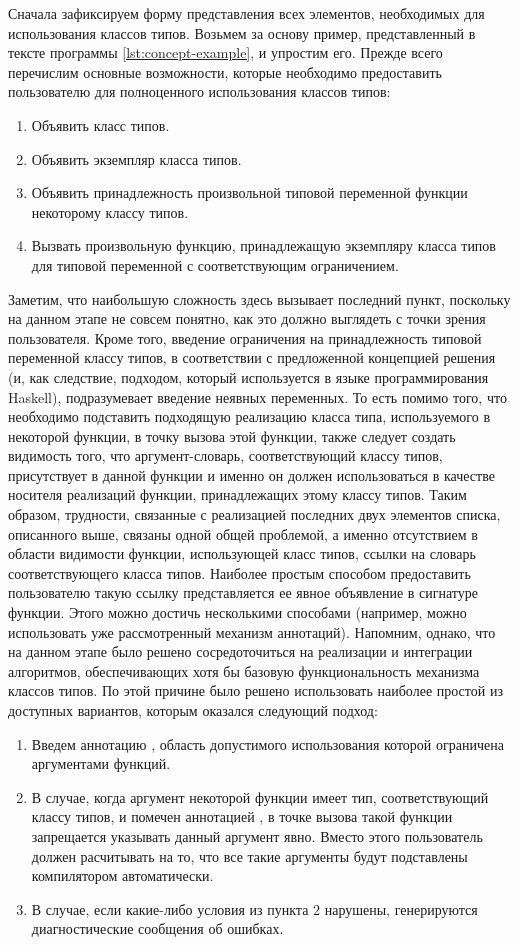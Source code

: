 Сначала зафиксируем форму представления всех элементов, необходимых для использования классов типов. Возьмем за основу пример, представленный в тексте программы \ref{lst:concept-example}, и упростим его. Прежде всего перечислим основные возможности, которые необходимо предоставить пользователю для полноценного использования классов типов:
\begin{enumerate}
    \item Объявить класс типов.
    \item Объявить экземпляр класса типов.
    \item Объявить принадлежность произвольной типовой переменной функции некоторому классу типов.
    \item Вызвать произвольную функцию, принадлежащую экземпляру класса типов для типовой переменной с соответствующим ограничением.   
\end{enumerate}
Заметим, что наибольшую сложность здесь вызывает последний пункт, поскольку на данном этапе не совсем понятно, как это должно выглядеть с точки зрения пользователя. Кроме того, введение ограничения на принадлежность типовой переменной классу типов, в соответствии с предложенной концепцией решения (и, как следствие, подходом, который используется в языке программирования Haskell), подразумевает введение неявных переменных. То есть помимо того, что необходимо подставить подходящую реализацию класса типа, используемого в некоторой функции, в точку вызова этой функции, также следует создать видимость того, что аргумент-словарь, соответствующий классу типов, присутствует в данной функции и именно он должен использоваться в качестве носителя реализаций функции, принадлежащих этому классу типов. Таким образом, трудности, связанные с реализацией последних двух элементов списка, описанного выше, связаны одной общей проблемой, а именно отсутствием в области видимости функции, использующей класс типов, ссылки на словарь соответствующего класса типов. Наиболее простым способом предоставить пользователю такую ссылку представляется ее явное объявление в сигнатуре функции. Этого можно достичь несколькими способами (например, можно использовать уже рассмотренный механизм аннотаций). Напомним, однако, что на данном этапе было решено сосредоточиться на реализации и интеграции алгоритмов, обеспечивающих хотя бы базовую функциональность механизма классов типов. По этой причине было решено использовать наиболее простой из доступных вариантов, которым оказался следующий подход:
\begin{enumerate} 
    \item Введем аннотацию , область допустимого использования которой ограничена аргументами функций. 
    \item В случае, когда аргумент некоторой функции имеет тип, соответствующий классу типов, и помечен аннотацией , в точке вызова такой функции запрещается указывать данный аргумент явно. Вместо этого пользователь должен расчитывать на то, что все такие аргументы будут подставлены компилятором автоматически. 
    \item В случае, если какие-либо условия из пункта $2$ нарушены, генерируются диагностические сообщения об ошибках.
\end{enumerate}
